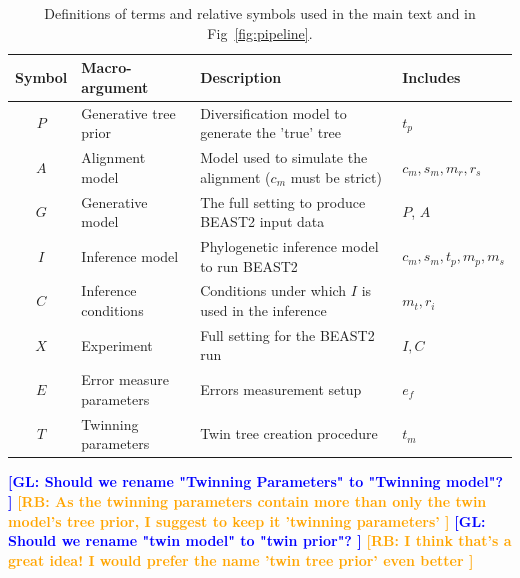 \documentclass{article}
\newcommand{\giovanni}[1]{\textcolor{blue}{\textbf{[GL: #1]}}}
\newcommand{\richel}[1]{\textcolor{orange}{\textbf{[RB: #1]}}}
\begin{document}
\begin{table}
  \begin{tabular}{|@{}c|p{4cm}|p{9cm}|p{3cm}@{}|}
    \hline
    \centering
    \textbf{Symbol} & \textbf{Macro-argument} & \textbf{Description} & \textbf{Includes} \\
    \hline
    $\mathit{P}$ & Generative tree prior & Diversification model to generate the 'true' tree & $\mathit{t_{p}}$ \\
    $\mathit{A}$ & Alignment model & Model used to simulate the alignment ($\mathit{c_{m}}$ must be strict) & $\mathit{c_{m}}, \mathit{s_{m}}, \mathit{m_{r}}, \mathit{r_{s}}$ \\
    $\mathit{G}$ & Generative model & The full setting to produce BEAST2 input data & $\mathit{P}$, $\mathit{A}$ \\
    $\mathit{I}$ & Inference model & Phylogenetic inference model to run BEAST2 & $\mathit{c_{m}},\mathit{s_{m}},\mathit{t_{p}},\mathit{m_{p}},\mathit{m_{s}}$ \\
    $\mathit{C}$ & Inference conditions & Conditions under which $\mathit{I}$ is used in the inference & $\mathit{m_{t}}, \mathit{r_{i}}$\\
    $\mathit{X}$ & Experiment & Full setting for the BEAST2 run & $\mathit{I},\mathit{C}$ \\
    $\mathit{E}$ & Error measure parameters & Errors measurement setup & $\mathit{e_{f}}$\\
    $\mathit{T}$ & Twinning parameters & Twin tree creation procedure & $\mathit{t_{m}}$\\
    \hline 
  \end{tabular}
  \caption{
    Definitions of terms and relative symbols used in the main text and in Fig~\ref{fig:pipeline}.
  }
  \label{tab:definitions}
  \giovanni{
    Should we rename "Twinning Parameters" to "Twinning model"?
  }
  \richel{
    As the twinning parameters contain more than only the twin model's tree prior,
    I suggest to keep it 'twinning parameters'
  }
  \giovanni{
    Should we rename "twin model" to "twin prior"?
  }
  \richel{
    I think that's a great idea! I would prefer the name 'twin tree prior' even
    better
  }
\end{table}
\end{document}
